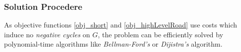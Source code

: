 \subsubsection{Solution Procedere}

As objective functions \ref{obj_short} and  \ref{obj_highLevelRoad}
use costs which induce no \emph{negative cycles}  on $G$, the problem can be efficiently solved
by polynomial-time algorithms like
\emph{Bellman-Ford's} \cite{Bell1958,Ford1956} or \emph{Dijistra's} \cite{dijkstra1959note} algorithm.


%
%
%
%


